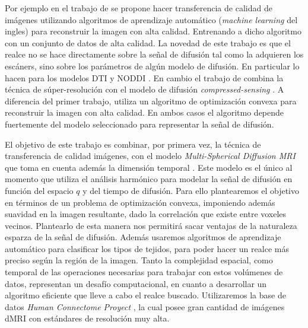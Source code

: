 \documentclass[a4paper,10pt]{article}
\begin{document}
Por ejemplo en el trabajo de \citet{Alexander2014} se propone hacer transferencia de 
calidad de imágenes utilizando algoritmos de aprendizaje automático 
(\textit{machine learning} del ingles) para reconstruir la imagen con alta 
calidad. Entrenando a dicho algoritmo con un conjunto de datos de alta 
calidad. La novedad de este trabajo es que el realce no se hace directamente 
sobre la señal de difusión tal como la adquieren los escáners, sino sobre los 
parámetros de algún modelo de difusión. En particular lo hacen para los modelos DTI y NODDI 
\citep{Zhang2012}. 
En cambio el trabajo de \citet{Ning2016} combina la 
t\'ecnica de súper-resolución con el modelo de difusión \textit{compressed-sensing} \citep{Naidoo2015}. A 
diferencia del primer trabajo, utiliza un algoritmo de optimización convexa para reconstruir la imagen con alta 
calidad. En ambos casos el algoritmo depende fuertemente del modelo seleccionado para representar la señal de difusión.

El objetivo de este trabajo es combinar, por primera vez, la técnica de transferencia de calidad imágenes, con el 
modelo \textit{Multi-Spherical Diffusion MRI} que toma en cuenta además la dimensión temporal \citep{Fick}. Este modelo 
es el \'unico al momento que utiliza el análisis harmónico para modelar la señal de difusión en función del espacio $q$ 
y del tiempo de difusión. Para ello plantearemos el objetivo en términos de un problema de optimización convexa, 
imponiendo además suavidad en la imagen resultante, dado la correlaci\'on que existe entre voxeles vecinos. Plantearlo 
de esta manera nos permitirá sacar ventajas de la naturaleza esparza de la señal de difusión. Además usaremos 
algoritmos de aprendizaje automático para clasificar los tipos de tejidos, para poder hacer un realce más preciso según 
la región de la imagen. Tanto la complejidad espacial, como temporal de las operaciones necesarias para trabajar con 
estos vol\'umenes de datos, representan un desafío computacional, en cuanto a desarrollar un algoritmo eficiente que 
lleve a cabo el realce buscado. Utilizaremos la base de datos \textit{Human Connectome Proyect} \citep{Barch2013}, la 
cual posee gran cantidad de imágenes dMRI con estándares de resolución muy alta.


\clearpage


\end{document}
